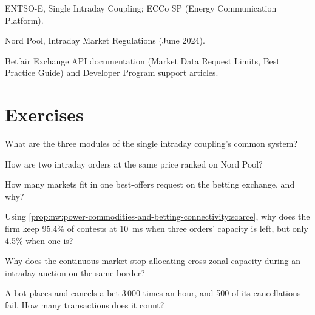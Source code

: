\begin{omsources}
\item ENTSO-E, Single Intraday Coupling; ECCo SP (Energy Communication Platform).
\item Nord Pool, Intraday Market Regulations (June 2024).
\item Betfair Exchange API documentation (Market Data Request Limits, Best Practice Guide) and Developer Program support articles.
\end{omsources}

\section{Exercises}

\begin{exercise}[$\star$]\label{exo:nw:power-commodities-and-betting-connectivity:1}
What are the three modules of the single intraday coupling's common system?
\end{exercise}

\begin{exercise}[$\star$]\label{exo:nw:power-commodities-and-betting-connectivity:2}
How are two intraday orders at the same price ranked on Nord Pool?
\end{exercise}

\begin{exercise}[$\star$]\label{exo:nw:power-commodities-and-betting-connectivity:3}
How many markets fit in one best-offers request on the betting exchange, and why?
\end{exercise}

\begin{exercise}[$\star\star$]\label{exo:nw:power-commodities-and-betting-connectivity:4}
Using \cref{prop:nw:power-commodities-and-betting-connectivity:scarce}, why does the firm keep 95.4\% of contests at
\qty{10}{\milli\second} when three orders' capacity is left, but only 4.5\% when one is?
\end{exercise}

\begin{exercise}[$\star\star$]\label{exo:nw:power-commodities-and-betting-connectivity:5}
Why does the continuous market stop allocating cross-zonal capacity during an intraday auction on the same border?
\end{exercise}

\begin{exercise}[$\star\star$]\label{exo:nw:power-commodities-and-betting-connectivity:6}
A bot places and cancels a bet 3\,000 times an hour, and 500 of its cancellations fail. How many transactions does it count?
\end{exercise}

